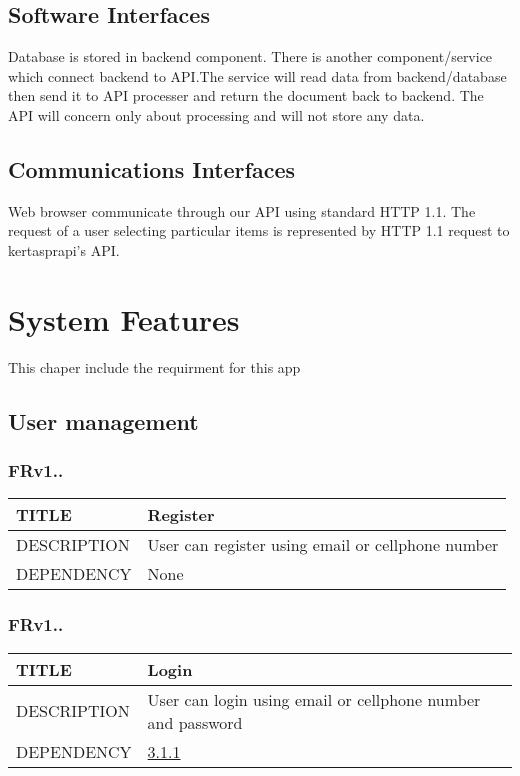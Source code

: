 \documentclass{scrreprt}
\begin{document}
\section{Software Interfaces}
Database is stored in backend component. There is another component/service which connect backend to API.The service will read data from backend/database then send it to API processer and return the document back to backend. The API will concern only about processing and will not store any data.   

\section{Communications Interfaces}
Web browser communicate through our API using standard HTTP 1.1. The request of a user selecting particular items is represented by HTTP 1.1 request to kertasprapi's API. 

\chapter{System Features}
This chaper include the requirment for this app

\section{User management}

\subsection{FRv1..}
\label{fr:register}
\begin{center}
    \begin{tabular}{|l|L{9cm}|}
        \hline
         TITLE& Register\\ \hline
         DESCRIPTION& User can register using email or cellphone number   \\ \hline
         DEPENDENCY& None \\ \hline
    \end{tabular}
\end{center}

\subsection{FRv1..}
\label{fr:login}
\begin{center}
    \begin{tabular}{|l|L{9cm}|}
        \hline
         TITLE& Login\\ \hline
         DESCRIPTION& User can login using email or cellphone number and password   \\ \hline
         DEPENDENCY& \ref{fr:register}\\ \hline
    \end{tabular}
\end{center}
\end{document}
